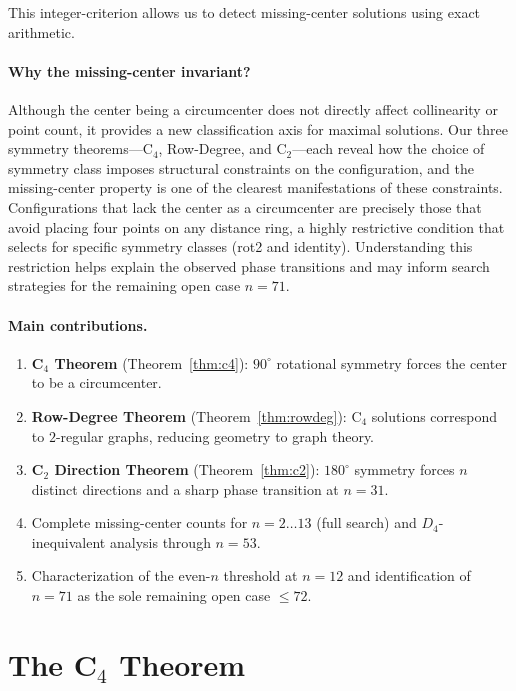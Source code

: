 \documentclass[11pt,a4paper]{article}
\theoremstyle{plain}
\theoremstyle{definition}
\begin{document}
\noindent This integer-criterion allows us to detect missing-center solutions using exact arithmetic.

\paragraph{Why the missing-center invariant?} Although the center being a circumcenter does not directly affect collinearity or point count, it provides a new classification axis for maximal solutions. Our three symmetry theorems---C$_4$, Row-Degree, and C$_2$---each reveal how the choice of symmetry class imposes structural constraints on the configuration, and the missing-center property is one of the clearest manifestations of these constraints. Configurations that lack the center as a circumcenter are precisely those that avoid placing four points on any distance ring, a highly restrictive condition that selects for specific symmetry classes (rot2 and identity). Understanding this restriction helps explain the observed phase transitions and may inform search strategies for the remaining open case $n=71$.

\paragraph{Main contributions.}
\begin{enumerate}[nosep]
\item \textbf{C$_4$ Theorem} (Theorem~\ref{thm:c4}): $90^\circ$ rotational symmetry forces the center to be a circumcenter.
\item \textbf{Row-Degree Theorem} (Theorem~\ref{thm:rowdeg}): C$_4$ solutions correspond to $2$-regular graphs, reducing geometry to graph theory.
\item \textbf{C$_2$ Direction Theorem} (Theorem~\ref{thm:c2}): $180^\circ$ symmetry forces $n$ distinct directions and a sharp phase transition at $n=31$.
\item Complete missing-center counts for $n=2\dots13$ (full search) and $D_4$-inequivalent analysis through $n=53$.
\item Characterization of the even-$n$ threshold at $n=12$ and identification of $n=71$ as the sole remaining open case $\le 72$.
\end{enumerate}


\section{The C$_4$ Theorem}
\label{sec:c4}
\end{document}
